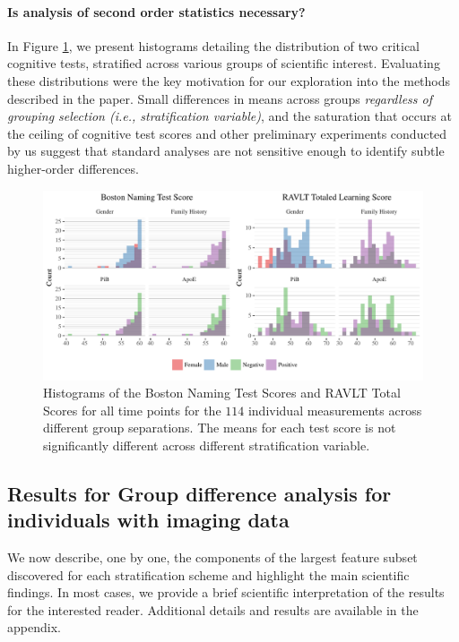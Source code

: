 \paragraph{Is analysis of second order statistics necessary?} In Figure \ref{fig:imagehists}, we present histograms detailing the distribution of two critical cognitive tests, stratified across various groups of scientific interest. Evaluating these distributions were the key motivation for our exploration into the methods described in the paper. Small differences in means across groups {\em regardless of grouping selection (i.e., stratification variable)}, and the saturation that occurs at the ceiling of cognitive test scores and other preliminary experiments conducted by us suggest that standard analyses are not sensitive enough to identify subtle higher-order differences.
\begin{figure}
	\centering
	\includegraphics[width=\textwidth]{3_covtraj/figs/hists.pdf}
	\caption[Summary histograms of neuropsychological test scores for preclinical AD participants]{Histograms of the Boston Naming Test Scores and RAVLT Total Scores for all time points for the $114$ individual measurements across different group separations. The means for each test score is not significantly different across different stratification variable.}
	\label{fig:imagehists}
\end{figure}
\subsection{Results for Group difference analysis for individuals with imaging data}
We now describe, one by one, the components of the largest feature subset discovered for each stratification scheme 
and highlight the main scientific findings. In most cases, we provide a brief scientific interpretation of the results
for the interested reader. 
Additional details and results are available in the appendix.
%

